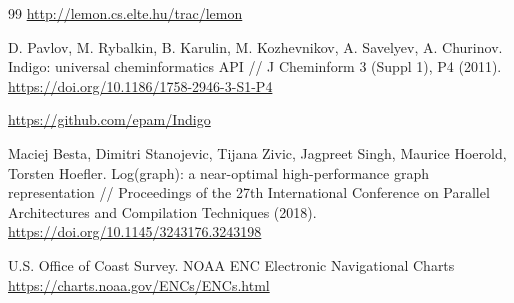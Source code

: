 \documentclass{article}
\theoremstyle{definition}
\begin{document}
\begin{thebibliography}{99}
    \url{http://lemon.cs.elte.hu/trac/lemon}
    
    D. Pavlov, M. Rybalkin, B. Karulin, M. Kozhevnikov, A. Savelyev, A. Churinov. Indigo: universal cheminformatics API //
    J Cheminform 3 (Suppl 1), P4 (2011). \url{https://doi.org/10.1186/1758-2946-3-S1-P4}

    \url{https://github.com/epam/Indigo}

   Maciej Besta, Dimitri Stanojevic, Tijana Zivic,
    Jagpreet Singh, Maurice Hoerold, Torsten Hoefler.  Log(graph): a
    near-optimal high-performance graph representation // Proceedings
    of the 27th International Conference on Parallel Architectures and
    Compilation Techniques (2018).
    \url{https://doi.org/10.1145/3243176.3243198}

    U.S. Office of Coast Survey. NOAA ENC Electronic Navigational Charts
    \url{https://charts.noaa.gov/ENCs/ENCs.html}
    
\end{thebibliography}
\end{document}
